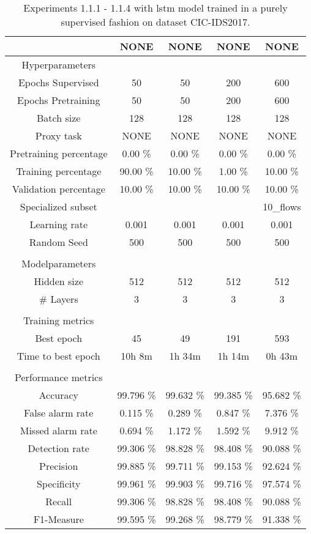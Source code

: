 \begin{table}[htb]
    \centering
    \begin{tabular}{@{}ccccc@{}}
        \toprule
         &  NONE &  NONE &  NONE &  NONE \\
        \midrule
        Hyperparameters &  &  &  &  \\
        Epochs Supervised &  50 &  50 &  200 &  600 \\
        Epochs Pretraining &  50 &  50 &  200 &  600 \\
        Batch size &  128 &  128 &  128 &  128 \\
        Proxy task &  NONE &  NONE &  NONE &  NONE \\
        Pretraining percentage &  0.00 \% &  0.00 \% &  0.00 \% &  0.00 \% \\
        Training percentage &  90.00 \% &  10.00 \% &  1.00 \% &  10.00 \% \\
        Validation percentage &  10.00 \% &  10.00 \% &  10.00 \% &  10.00 \% \\
        Specialized subset &   &   &   &  10\_flows \\
        Learning rate &  0.001 &  0.001 &  0.001 &  0.001 \\
        Random Seed &  500 &  500 &  500 &  500 \\
         \\
        Modelparameters &  &  &  &  \\
        Hidden size &  512 &  512 &  512 &  512 \\
        \# Layers &  3 &  3 &  3 &  3 \\
         \\
        Training metrics &  &  &  &  \\
        Best epoch &  45 &  49 &  191 &  593 \\
        Time to best epoch &  10h 8m &  1h 34m &  1h 14m &  0h 43m \\
         \\
        Performance metrics &  &  &  &  \\
        Accuracy &  99.796 \% &  99.632 \% &  99.385 \% &  95.682 \% \\
        False alarm rate &  0.115 \% &  0.289 \% &  0.847 \% &  7.376 \% \\
        Missed alarm rate &  0.694 \% &  1.172 \% &  1.592 \% &  9.912 \% \\
        Detection rate &  99.306 \% &  98.828 \% &  98.408 \% &  90.088 \% \\
        Precision &  99.885 \% &  99.711 \% &  99.153 \% &  92.624 \% \\
        Specificity &  99.961 \% &  99.903 \% &  99.716 \% &  97.574 \% \\
        Recall &  99.306 \% &  98.828 \% &  98.408 \% &  90.088 \% \\
        F1-Measure &  99.595 \% &  99.268 \% &  98.779 \% &  91.338 \% \\
        \bottomrule
    \end{tabular}
    \caption{Experiments 1.1.1 - 1.1.4 with \gls{lstm} model trained in a purely supervised fashion on dataset CIC-IDS2017.}
    \label{table:results:lstm:flows_supervised}
\end{table}